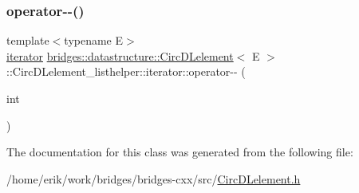 \mbox{\label{classbridges_1_1datastructure_1_1_circ_d_lelement_1_1_circ_d_lelement__listhelper_1_1iterator_aa92dbdc5af7168113518f5c1d4eeb91c}} 
\subsubsection{\texorpdfstring{operator-\/-\/()}{operator--()}\hspace{0.1cm}{\footnotesize\ttfamily [2/2]}}
{\footnotesize\ttfamily template$<$typename E$>$ \\
\hyperlink{classbridges_1_1datastructure_1_1_circ_d_lelement_1_1_circ_d_lelement__listhelper_1_1iterator}{iterator} \hyperlink{classbridges_1_1datastructure_1_1_circ_d_lelement}{bridges\+::datastructure\+::\+Circ\+D\+Lelement}$<$ E $>$\+::Circ\+D\+Lelement\+\_\+listhelper\+::iterator\+::operator-\/-\/ (\begin{DoxyParamCaption}\item[{int}]{ }\end{DoxyParamCaption})\hspace{0.3cm}{\ttfamily [inline]}}



The documentation for this class was generated from the following file\+:\begin{DoxyCompactItemize}
\item 
/home/erik/work/bridges/bridges-\/cxx/src/\hyperlink{_circ_d_lelement_8h}{Circ\+D\+Lelement.\+h}\end{DoxyCompactItemize}
